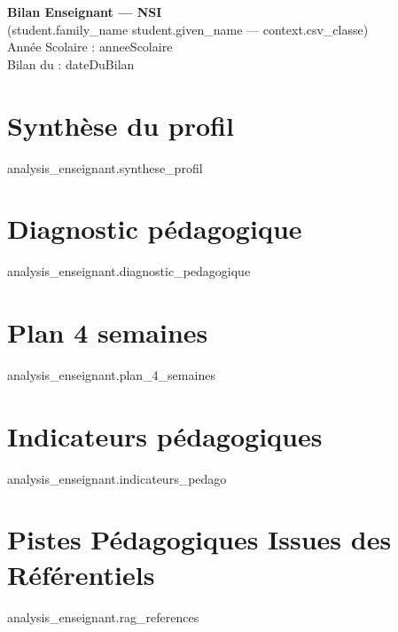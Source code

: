 \documentclass[12pt,a4paper]{article}
\begin{document}
\begin{center}
\Large\textbf{Bilan Enseignant — NSI}\\[0.4em]
\normalsize ({{student.family_name}} {{student.given_name}} — {{context.csv_classe}})\\[0.2em]
\normalsize Année Scolaire : {{anneeScolaire}} \\ \normalsize Bilan du : {{dateDuBilan}}
\end{center}

\vspace{0.8em}
\section*{Synthèse du profil}
{{analysis_enseignant.synthese_profil}}

\vspace{0.6em}
\section*{Diagnostic pédagogique}
{{analysis_enseignant.diagnostic_pedagogique}}

\vspace{0.6em}
\section*{Plan 4 semaines}
{{analysis_enseignant.plan_4_semaines}}

\vspace{0.6em}
\section*{Indicateurs pédagogiques}
{{analysis_enseignant.indicateurs_pedago}}

\vspace{0.6em}
\section*{Pistes Pédagogiques Issues des Référentiels}
\begin{bluebox}
{{analysis_enseignant.rag_references}}
\end{bluebox}
\end{document}
